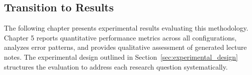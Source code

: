 \subsection{Transition to Results}

The following chapter presents experimental results evaluating this methodology. Chapter 5 reports quantitative performance metrics across all configurations, analyzes error patterns, and provides qualitative assessment of generated lecture notes. The experimental design outlined in Section~\ref{sec:experimental_design} structures the evaluation to address each research question systematically.

%
%
%
%
%
%
%
%
%
%
%
%
